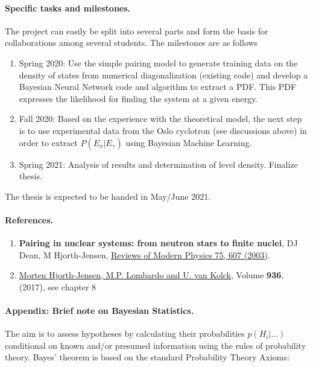\documentclass[%
oneside,                 %
final,                   %
10pt]{article}
\begin{document}
\paragraph{Specific tasks and milestones.}
The project can easily be split into several parts and form the basis
for collaborations among several students. The milestones are as
follows

\begin{enumerate}
\item Spring 2020: Use the simple pairing model to generate training data on the density of states from numerical diagonalization (existing code) and develop a Bayesian Neural Network code and algorithm to extract a PDF. This PDF expresses the likelihood for finding the system at a given energy.

\item Fall 2020: Based on the experience with the theoretical model, the next step is to use experimental data from the Oslo cyclotron (see discussions above) in order to extract $P(E_x\vert E_{\gamma})$ using Bayesian Machine Learning.

\item Spring 2021: Analysis of results and determination of level density. Finalize thesis. 
\end{enumerate}

\noindent
The thesis is expected to be handed in May/June  2021.


\paragraph{References.}
\begin{enumerate}
\item \textbf{Pairing in nuclear systems: from neutron stars to finite nuclei}, DJ Dean, M Hjorth-Jensen, \href{{http://journals.aps.org/rmp/abstract/10.1103/RevModPhys.75.607}}{Reviews of Modern Physics 75, 607  (2003)}.

\item \href{{http://www.springer.com/us/book/9783319533353}}{Morten Hjorth-Jensen, M.P. Lombardo and U. van Kolck}, Volume \textbf{936}, (2017), see chapter 8
\end{enumerate}

\noindent
\paragraph{Appendix: Brief note on Bayesian Statistics.}
The aim is  to assess hypotheses by calculating their probabilities $p(H_i | \ldots)$ conditional on known and/or presumed information using the rules of probability theory.
Bayes' theorem is based on the standard  Probability Theory Axioms:
\end{document}
